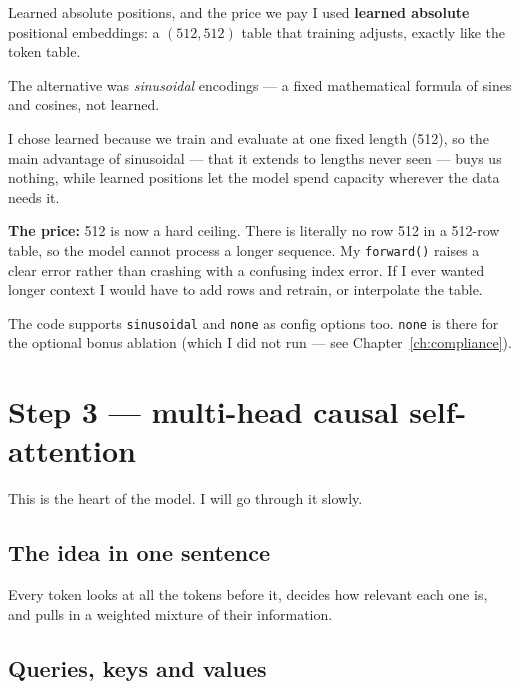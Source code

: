 \documentclass[11pt]{report}
\newcommand{\p}[1]{\texttt{#1}}
\begin{document}
\begin{implementation}{Learned absolute positions, and the price we pay}
I used \textbf{learned absolute} positional embeddings: a $(512, 512)$ table
that training adjusts, exactly like the token table.

The alternative was \emph{sinusoidal} encodings --- a fixed mathematical formula
of sines and cosines, not learned.

I chose learned because we train and evaluate at one fixed length (512), so the
main advantage of sinusoidal --- that it extends to lengths never seen --- buys
us nothing, while learned positions let the model spend capacity wherever the
data needs it.

\textbf{The price:} 512 is now a hard ceiling. There is literally no row 512 in a
512-row table, so the model cannot process a longer sequence. My \p{forward()}
raises a clear error rather than crashing with a confusing index error. If I ever
wanted longer context I would have to add rows and retrain, or interpolate the
table.

The code supports \p{sinusoidal} and \p{none} as config options too. \p{none} is
there for the optional bonus ablation (which I did not run --- see
Chapter~\ref{ch:compliance}).
\end{implementation}

\section{Step 3 --- multi-head causal self-attention}

This is the heart of the model. I will go through it slowly.

\subsection{The idea in one sentence}

Every token looks at all the tokens before it, decides how relevant each one is,
and pulls in a weighted mixture of their information.

\subsection{Queries, keys and values}
\end{document}
